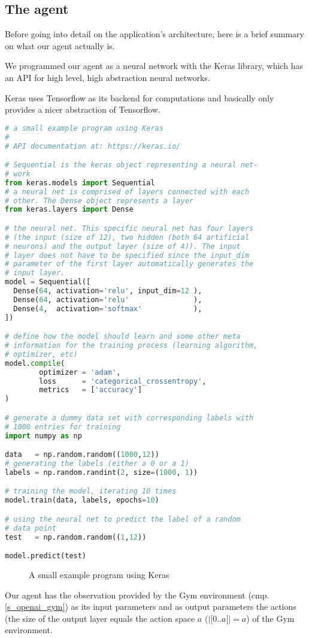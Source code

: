 \subsection{The agent}
\label{s_agent}

Before going into detail on the application's architecture,
here is a brief summary on what our agent actually is.

We programmed our agent as a neural network with the Keras
library, which has an API for high level, high abstraction
neural networks.

Keras uses Tensorflow as its backend for computations and
basically only provides a nicer abstraction of Tensorflow.

\begin{mdframed}[style=codebox]
\begin{lstlisting}[language=Python]
# a small example program using Keras
#
# API documentation at: https://keras.io/

# Sequential is the keras object representing a neural net-
# work
from keras.models import Sequential
# a neural net is comprised of layers connected with each
# other. The Dense object represents a layer
from keras.layers import Dense

# the neural net. This specific neural net has four layers
# (the input (size of 12), two hidden (both 64 artificial
# neurons) and the output layer (size of 4)). The input
# layer does not have to be specified since the input_dim
# parameter of the first layer automatically generates the
# input layer.
model = Sequential([
  Dense(64, activation='relu', input_dim=12 ),
  Dense(64, activation='relu'               ),
  Dense(4,  activation='softmax'            ),
])

# define how the model should learn and some other meta
# information for the training process (learning algorithm,
# optimizer, etc)
model.compile(
        optimizer = 'adam',
        loss      = 'categorical_crossentropy',
        metrics   = ['accuracy']
)

# generate a dummy data set with corresponding labels with
# 1000 entries for training
import numpy as np

data   = np.random.random((1000,12))
# generating the labels (either a 0 or a 1)
labels = np.random.randint(2, size=(1000, 1))

# training the model, iterating 10 times
model.train(data, labels, epochs=10)

# using the neural net to predict the label of a random
# data point
test   = np.random.random((1,12))

model.predict(test)
\end{lstlisting}
\end{mdframed}
\begin{figure}[H]
\caption{A small example program using Keras}
\end{figure}

Our agent has the observation provided by the Gym
environment (cmp. \ref{s_openai_gym}) as its input
parameters and as output parameters the actions (the size
of the output layer equals the action space $a$
($|[0..a[| = a$) of the Gym environment.

